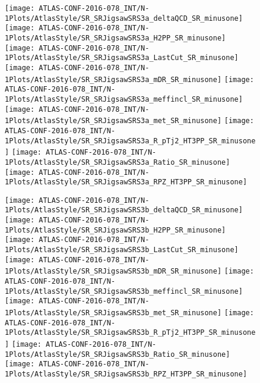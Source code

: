 \begin{figure}[tbph]
\begin{center}
\texttt{[image: ATLAS-CONF-2016-078\_INT/N-1Plots/AtlasStyle/SR\_SRJigsawSRS3a\_deltaQCD\_SR\_minusone]}
\texttt{[image: ATLAS-CONF-2016-078\_INT/N-1Plots/AtlasStyle/SR\_SRJigsawSRS3a\_H2PP\_SR\_minusone]}
\texttt{[image: ATLAS-CONF-2016-078\_INT/N-1Plots/AtlasStyle/SR\_SRJigsawSRS3a\_LastCut\_SR\_minusone]}
\texttt{[image: ATLAS-CONF-2016-078\_INT/N-1Plots/AtlasStyle/SR\_SRJigsawSRS3a\_mDR\_SR\_minusone]}
\texttt{[image: ATLAS-CONF-2016-078\_INT/N-1Plots/AtlasStyle/SR\_SRJigsawSRS3a\_meffincl\_SR\_minusone]}
\texttt{[image: ATLAS-CONF-2016-078\_INT/N-1Plots/AtlasStyle/SR\_SRJigsawSRS3a\_met\_SR\_minusone]}
\texttt{[image: ATLAS-CONF-2016-078\_INT/N-1Plots/AtlasStyle/SR\_SRJigsawSRS3a\_R\_pTj2\_HT3PP\_SR\_minusone]}
\texttt{[image: ATLAS-CONF-2016-078\_INT/N-1Plots/AtlasStyle/SR\_SRJigsawSRS3a\_Ratio\_SR\_minusone]}
\texttt{[image: ATLAS-CONF-2016-078\_INT/N-1Plots/AtlasStyle/SR\_SRJigsawSRS3a\_RPZ\_HT3PP\_SR\_minusone]}
\end{center}
\caption{}
\label{fig:SR_SRJigsawSRS2b_H2PP_SR_minusone}
\end{figure}

\begin{figure}[tbph]
\begin{center}
\texttt{[image: ATLAS-CONF-2016-078\_INT/N-1Plots/AtlasStyle/SR\_SRJigsawSRS3b\_deltaQCD\_SR\_minusone]}
\texttt{[image: ATLAS-CONF-2016-078\_INT/N-1Plots/AtlasStyle/SR\_SRJigsawSRS3b\_H2PP\_SR\_minusone]}
\texttt{[image: ATLAS-CONF-2016-078\_INT/N-1Plots/AtlasStyle/SR\_SRJigsawSRS3b\_LastCut\_SR\_minusone]}
\texttt{[image: ATLAS-CONF-2016-078\_INT/N-1Plots/AtlasStyle/SR\_SRJigsawSRS3b\_mDR\_SR\_minusone]}
\texttt{[image: ATLAS-CONF-2016-078\_INT/N-1Plots/AtlasStyle/SR\_SRJigsawSRS3b\_meffincl\_SR\_minusone]}
\texttt{[image: ATLAS-CONF-2016-078\_INT/N-1Plots/AtlasStyle/SR\_SRJigsawSRS3b\_met\_SR\_minusone]}
\texttt{[image: ATLAS-CONF-2016-078\_INT/N-1Plots/AtlasStyle/SR\_SRJigsawSRS3b\_R\_pTj2\_HT3PP\_SR\_minusone]}
\texttt{[image: ATLAS-CONF-2016-078\_INT/N-1Plots/AtlasStyle/SR\_SRJigsawSRS3b\_Ratio\_SR\_minusone]}
\texttt{[image: ATLAS-CONF-2016-078\_INT/N-1Plots/AtlasStyle/SR\_SRJigsawSRS3b\_RPZ\_HT3PP\_SR\_minusone]}
\end{center}
\caption{}
\label{fig:SR_SRJigsawSRS3a_meffincl_SR_minusone}
\end{figure}

\clearpage

